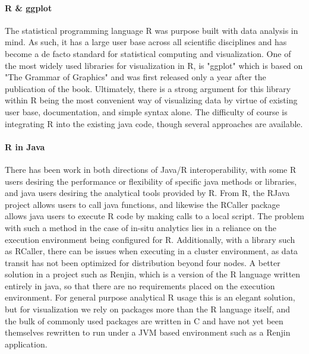 \paragraph{R \& ggplot}
The statistical programming language R was purpose built with data analysis in mind. As such, it has a large user base across all scientific disciplines and has become a de facto standard for statistical computing and visualization. One of the most widely used libraries for visualization in R, is "ggplot" \cite{Hadley2006} which is based on "The Grammar of Graphics" and was first released only a year after the publication of the book. Ultimately, there is a strong argument for this library within R being the most convenient way of visualizing data by virtue of existing user base, documentation, and simple syntax alone. The difficulty of course is integrating R into the existing java code, though several approaches are available. 

\paragraph{R in Java}
There has been work in both directions of Java/R interoperability, with some R users desiring the performance or flexibility of specific java methods or libraries, and java users desiring the analytical tools provided by R. From R, the RJava project allows users to call java functions, and likewise the RCaller package allows java users to execute R code by making calls to a local script. The problem with such a method in the case of in-situ analytics lies in a reliance on the execution environment being configured for R. Additionally, with a library such as RCaller, there can be issues when executing in a cluster environment, as data transit has not been optimized for distribution beyond four nodes. A better solution in a project such as Renjin, which is a version of the R language written entirely in java, so that there are no requirements placed on the execution environment. For general purpose analytical R usage this is an elegant solution, but for visualization we rely on packages more than the R language itself, and the bulk of commonly used packages are written in C and have not yet been themselves rewritten to run under a JVM based environment such as a Renjin application.

